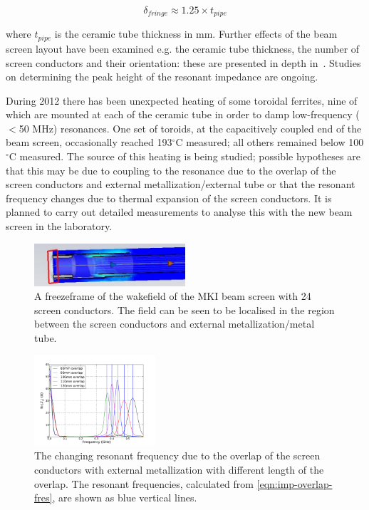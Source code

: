 \documentclass{JAC2003}
\begin{document}
\begin{equation}
\delta_{fringe} \approx 1.25 \times t_{pipe}
\end{equation}

where $t_{pipe}$ is the ceramic tube thickness in mm. Further effects of the beam screen layout have been examined e.g. the ceramic tube thickness, the number of screen conductors and their orientation: these are presented in depth in~\cite{DayThesis}. Studies on determining the peak height of the resonant impedance are ongoing. 

During 2012 there has been unexpected heating of some toroidal ferrites, nine of which are mounted at each of the ceramic tube in order to damp low-frequency ($<$50 MHz) resonances. One set of toroids, at the capacitively coupled end of the beam screen, occasionally reached 193$^{\circ}$C measured; all others remained below 100$^{\circ}$C measured. The source of this heating is being studied; possible hypotheses are that this may be due to coupling to the resonance due to the overlap of the screen conductors and external metallization/external tube or that the resonant frequency changes due to thermal expansion of the screen conductors. It is planned to carry out detailed measurements to analyse this with the new beam screen in the laboratory.

\begin{figure}
\includegraphics[width=0.5\textwidth]{TUPME033f4.jpeg}
\caption{A freezeframe of the wakefield of the MKI beam screen with 24 screen conductors. The field can be seen to be localised in the region between the screen conductors and external metallization/metal tube.}
\label{fig:mkiResFieldPat}
\end{figure}

\begin{figure}
\begin{center}
\includegraphics[width=0.4\textwidth]{TUPME033f5.pdf}
\caption{The changing resonant frequency due to the overlap of the screen conductors with external metallization with different length of the overlap. The resonant frequencies, calculated from \ref{eqn:imp-overlap-fres}, are shown as blue vertical lines.}
\label{fig:mkiOverlapRes}
\end{center}
\end{figure}
\end{document}
